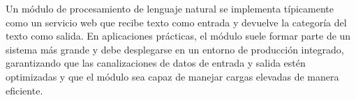Un módulo de procesamiento de lenguaje natural se implementa típicamente como un servicio web que recibe texto como entrada y devuelve la categoría del texto como salida. En aplicaciones prácticas, el módulo suele formar parte de un sistema más grande y debe desplegarse en un entorno de producción integrado, garantizando que las canalizaciones de datos de entrada y salida estén optimizadas y que el módulo sea capaz de manejar cargas elevadas de manera eficiente.